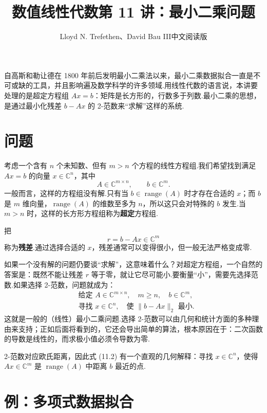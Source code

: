 \documentclass[UTF8,fontset=none,12pt]{ctexart}
\title{数值线性代数\quad 第 11 讲：最小二乘问题}
\author{Lloyd N. Trefethen、David Bau III\quad 中文阅读版}
\date{}
\newcommand{\C}{\mathbb{C}}
\newcommand{\range}{\operatorname{range}}
\theoremstyle{definition}
\begin{document}
\maketitle
\pagestyle{plain}

自高斯和勒让德在 1800 年前后发明最小二乘法以来，最小二乘数据拟合一直是不可或缺的工具，并且影响遍及数学科学的许多领域.用线性代数的语言说，本讲要处理的是超定方程组 $Ax=b$：矩阵是长方形的，行数多于列数.最小二乘的思想，是通过最小化残差 $b-Ax$ 的 2-范数来“求解”这样的系统.

\section*{问题}

考虑一个含有 $n$ 个未知数、但有 $m>n$ 个方程的线性方程组.我们希望找到满足 $Ax=b$ 的向量 $x\in\C^n$，其中
\[
    A\in\C^{m\times n},\qquad b\in\C^m.
\]
一般而言，这样的方程组没有解.只有当 $b\in\range(A)$ 时才存在合适的 $x$；而 $b$ 是 $m$ 维向量，$\range(A)$ 的维数至多为 $n$，所以这只会对特殊的 $b$ 发生.当 $m>n$ 时，这样的长方形方程组称为\textbf{超定}方程组.

把
\begin{equation}
    r=b-Ax\in\C^m
    \tag{11.1}
\end{equation}
称为\textbf{残差}.通过选择合适的 $x$，残差通常可以变得很小，但一般无法严格变成零.

如果一个没有解的问题仍要谈“求解”，这意味着什么？对超定方程组，一个自然的答案是：既然不能让残差 $r$ 等于零，就让它尽可能小.要衡量“小”，需要先选择范数.如果选择 2-范数，问题就成为：
\begin{equation}
\begin{aligned}
&\text{给定 }A\in\C^{m\times n},\quad m\ge n,\quad b\in\C^m,\\
&\text{寻找 }x\in\C^n,\quad\text{使 }\|b-Ax\|_2\text{ 最小}.
\end{aligned}
\tag{11.2}
\end{equation}
这就是一般的（线性）最小二乘问题.选择 2-范数可以由几何和统计方面的多种理由来支持；正如后面将看到的，它还会导出简单的算法，根本原因在于：二次函数的导数是线性的，而求极小值必须令导数为零.

2-范数对应欧氏距离，因此式 (11.2) 有一个直观的几何解释：寻找 $x\in\C^n$，使得 $Ax\in\C^m$ 是 $\range(A)$ 中距离 $b$ 最近的点.

\section*{例：多项式数据拟合}
\end{document}
